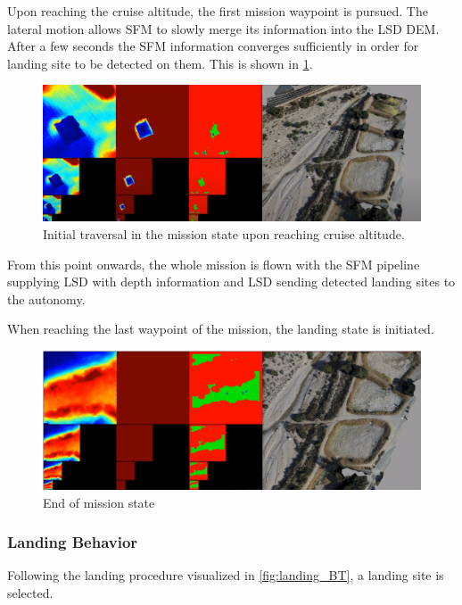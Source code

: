 Upon reaching the cruise altitude, the first mission waypoint is pursued. The lateral motion allows SFM to slowly merge its information into the LSD DEM. After a few seconds the SFM information converges sufficiently in order for landing site to be detected on them. This is shown in \cref{fig:demo_mission1}.

\begin{figure}[h]
\centering
\includegraphics[scale=0.25]{images/autonomous_landing/demo_flight/mission1.png}
\caption{Initial traversal in the mission state upon reaching cruise altitude.}
\label{fig:demo_mission1}
\end{figure}

From this point onwards, the whole mission is flown with the SFM pipeline supplying LSD with depth information and LSD sending detected landing sites to the autonomy.

When reaching the last waypoint of the mission, the landing state is initiated. 

\begin{figure}[h]
\centering
\includegraphics[scale=0.25]{images/autonomous_landing/demo_flight/mission_end.png}
\caption{End of mission state}
\label{fig:demo_mission_end}%
\end{figure}

\subsubsection{Landing Behavior}

Following the landing procedure visualized in \cref{fig:landing_BT}, a landing site is selected. 

